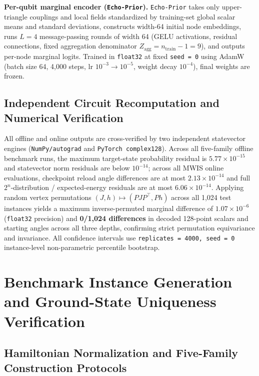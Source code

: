 \documentclass{article}
\theoremstyle{plain}
\theoremstyle{definition}
\begin{document}
\textbf{Per-qubit marginal encoder (\texttt{Echo-Prior}).} \texttt{Echo-Prior} takes only upper-triangle couplings and local fields standardized by training-set global scalar means and standard deviations, constructs width-64 initial node embeddings, runs $L=4$ message-passing rounds of width 64 (GELU activations, residual connections, fixed aggregation denominator $Z_{\mathrm{agg}}=n_{\mathrm{train}}-1=9$), and outputs per-node marginal logits. Trained in \texttt{float32} at fixed \texttt{seed = 0} using AdamW (batch size 64, 4,000 steps, lr $10^{-3}\to 10^{-5}$, weight decay $10^{-4}$), final weights are frozen.

\subsection{Independent Circuit Recomputation and Numerical Verification}\label{subsec:b_4}

All offline and online outputs are cross-verified by two independent statevector engines (\texttt{NumPy/\allowbreak{}autograd} and \texttt{PyTorch complex128}). Across all five-family offline benchmark runs, the maximum target-state probability residual is $5.77\times 10^{-15}$ and statevector norm residuals are below $10^{-14}$; across all MWIS online evaluations, checkpoint reload angle differences are at most $2.13\times 10^{-14}$ and full $2^n$-distribution / expected-energy residuals are at most $6.06\times 10^{-14}$. Applying random vertex permutations $(J,h)\mapsto(PJP^\top, Ph)$ across all 1,024 test instances yields a maximum inverse-permuted marginal difference of $1.07\times 10^{-6}$ (\texttt{float32} precision) and \textbf{0/1,024 differences} in decoded 128-point scalars and starting angles across all three depths, confirming strict permutation equivariance and invariance. All confidence intervals use \texttt{replicates = 4000, seed = 0} instance-level non-parametric percentile bootstrap.


\section{Benchmark Instance Generation and Ground-State Uniqueness Verification}\label{app:C}

\subsection{Hamiltonian Normalization and Five-Family Construction Protocols}\label{subsec:c_1}
\end{document}
